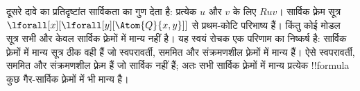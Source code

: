 \documentclass[../../../include/open-logic-section]{subfiles}
\begin{document}
दूसरे दावे का प्रतिदृष्टांत सार्विकता का गुण देता है: प्रत्येक $u$ और $v$
के लिए $Ruv$। सार्विक फ़्रेम सूत्र
$\lforall[x][\lforall[y][\Atom{Q}{x,y}]]$ से प्रथम-कोटि परिभाष्य हैं। किंतु
कोई मोडल सूत्र सभी और केवल सार्विक फ़्रेमों में मान्य नहीं है। यह स्वयं
रोचक एक परिणाम का निष्कर्ष है: सार्विक फ़्रेमों में मान्य सूत्र ठीक वही हैं
जो स्वपरावर्ती, सममित और संक्रमणशील फ़्रेमों में मान्य हैं। ऐसे स्वपरावर्ती,
सममित और संक्रमणशील फ़्रेम हैं जो सार्विक नहीं हैं; अतः सभी सार्विक फ़्रेमों
में मान्य प्रत्येक !!{formula} कुछ गैर-सार्विक फ़्रेमों में भी मान्य है।
\end{document}

